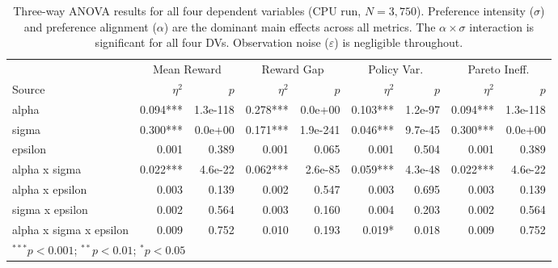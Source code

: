 \begin{table}[htbp]
\centering
\caption{Three-way ANOVA results for all four dependent variables (CPU run, $N = 3{,}750$). Preference intensity ($\sigma$) and preference alignment ($\alpha$) are the dominant main effects across all metrics. The $\alpha \times \sigma$ interaction is significant for all four DVs. Observation noise ($\varepsilon$) is negligible throughout.}
\label{tab:anova-full-cpu}
\begin{tabular}{l|rr|rr|rr|rr}
\toprule
 & \multicolumn{2}{c|}{Mean Reward} & \multicolumn{2}{c|}{Reward Gap} & \multicolumn{2}{c|}{Policy Var.} & \multicolumn{2}{c}{Pareto Ineff.} \\
Source & $\eta^2$ & $p$ & $\eta^2$ & $p$ & $\eta^2$ & $p$ & $\eta^2$ & $p$ \\
\midrule
alpha & 0.094*** & 1.3e-118 & 0.278*** & 0.0e+00 & 0.103*** & 1.2e-97 & 0.094*** & 1.3e-118 \\
sigma & 0.300*** & 0.0e+00 & 0.171*** & 1.9e-241 & 0.046*** & 9.7e-45 & 0.300*** & 0.0e+00 \\
epsilon & 0.001 & 0.389 & 0.001 & 0.065 & 0.001 & 0.504 & 0.001 & 0.389 \\
alpha x sigma & 0.022*** & 4.6e-22 & 0.062*** & 2.6e-85 & 0.059*** & 4.3e-48 & 0.022*** & 4.6e-22 \\
alpha x epsilon & 0.003 & 0.139 & 0.002 & 0.547 & 0.003 & 0.695 & 0.003 & 0.139 \\
sigma x epsilon & 0.002 & 0.564 & 0.003 & 0.160 & 0.004 & 0.203 & 0.002 & 0.564 \\
alpha x sigma x epsilon & 0.009 & 0.752 & 0.010 & 0.193 & 0.019* & 0.018 & 0.009 & 0.752 \\
\bottomrule
\multicolumn{9}{l}{\footnotesize $^{***}p < 0.001$; $^{**}p < 0.01$; $^{*}p < 0.05$} \\
\end{tabular}
\end{table}